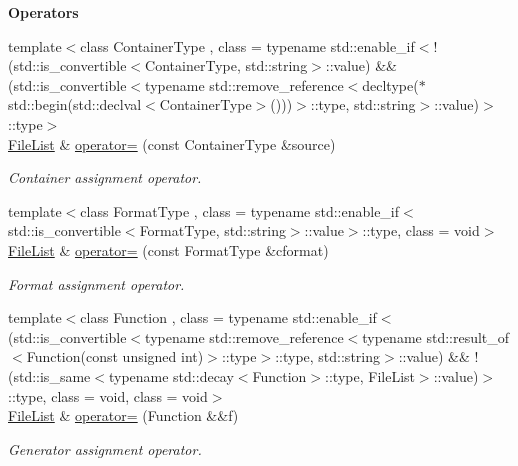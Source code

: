\begin{Indent}{\bf Operators}\par
\begin{DoxyCompactItemize}
\item 
{\footnotesize template$<$class Container\-Type , class  = typename std\-::enable\-\_\-if$<$!(std\-::is\-\_\-convertible$<$\-Container\-Type, std\-::string$>$\-::value) \&\& (std\-::is\-\_\-convertible$<$typename std\-::remove\-\_\-reference$<$decltype($\ast$std\-::begin(std\-::declval$<$\-Container\-Type$>$()))$>$\-::type, std\-::string$>$\-::value)$>$\-::type$>$ }\\\hyperlink{exceptionmagrathea_1_1FileList}{File\-List} \& \hyperlink{exceptionmagrathea_1_1FileList_a168863bbc6389aeef94c461eb30d0ee5}{operator=} (const Container\-Type \&source)
\begin{DoxyCompactList}\small\item\em Container assignment operator. \end{DoxyCompactList}\item 
{\footnotesize template$<$class Format\-Type , class  = typename std\-::enable\-\_\-if$<$std\-::is\-\_\-convertible$<$\-Format\-Type, std\-::string$>$\-::value$>$\-::type, class  = void$>$ }\\\hyperlink{exceptionmagrathea_1_1FileList}{File\-List} \& \hyperlink{exceptionmagrathea_1_1FileList_ae9120946db37a191724012232c1023eb}{operator=} (const Format\-Type \&cformat)
\begin{DoxyCompactList}\small\item\em Format assignment operator. \end{DoxyCompactList}\item 
{\footnotesize template$<$class Function , class  = typename std\-::enable\-\_\-if$<$(std\-::is\-\_\-convertible$<$typename std\-::remove\-\_\-reference$<$typename std\-::result\-\_\-of$<$\-Function(const unsigned int)$>$\-::type$>$\-::type, std\-::string$>$\-::value) \&\& !(std\-::is\-\_\-same$<$typename std\-::decay$<$\-Function$>$\-::type, File\-List$>$\-::value)$>$\-::type, class  = void, class  = void$>$ }\\\hyperlink{exceptionmagrathea_1_1FileList}{File\-List} \& \hyperlink{exceptionmagrathea_1_1FileList_adad7c6e58b07916e2c40a98d1f0c99e1}{operator=} (Function \&\&f)
\begin{DoxyCompactList}\small\item\em Generator assignment operator. \end{DoxyCompactList}\item 

\end{DoxyCompactItemize}
\end{Indent}
